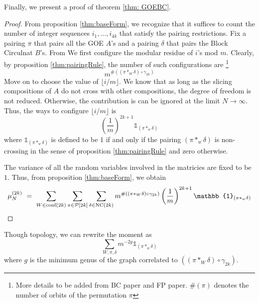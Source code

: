 \documentclass[12pt,reqno]{amsart}
\theoremstyle{plain} %
\theoremstyle{remark}
\theoremstyle{definition}
\begin{document}
Finally, we present a proof of theorem \ref{thm: GOEBC}.
\begin{proof} 
    From proposition \ref{thm:baseForm}, we recognize that 
    it suffices to count the number of integer sequences 
    $i_1, \dots, i_{4k}$ that satisfy the pairing restrictions. 
    Fix a pairing $\pi$ that pairs all the GOE $A$'s and a
    pairing $\delta$  that pairs the Block Circulnat $B$'s. 
    From 
    We first configure the modular residue of $i$'s mod $m$. 
    Clearly, by proposition \ref{thm:pairingRule}, the number of such configurations are \footnote{More details to be added 
    from BC paper and FP paper. $\#(\pi)$ denotes the number of orbits of the permutation $\pi$} 
    \[
    m^{
        \# ((\pi *_W \delta)\circ \gamma_{2k})
    }
    \]
    Move on to 
    choose the value of $\lfloor i / m \rfloor$. 
    We know that as long as the slicing compositions of $A$ do 
    not cross with other compositions, the degree of freedom 
    is not reduced. Otherwise, the contribution is can be ignored 
    at the limit $N \rightarrow \infty$. Thus, the ways to configure 
$\lfloor i / m \rfloor$ is 
\begin{equation}
        \left(
            \frac 1 m
        \right)^{2k + 1}
        \mathbb{1}_{(\pi*_w\delta)}
\end{equation}
where $\mathbb{1}_{(\pi*_w\delta)}$ is defined to be $1$ if and only if 
the pairing $(\pi*_w\delta)$ is non-crossing in the sense of proposition 
\ref{thm:pairingRule} and zero otherwise. 

The variance of all the random variables involved in the matricies are 
fixed to be $1$. Thus, from proposition \ref{thm:baseForm}, we obtain 
\label{thm: GOEBC}
    \begin{equation}
        \mu_N^{(2k)} \ = \ 
        \sum_{W \in \PW(2k)}
        \sum_{\pi \in \mathcal P[2k]}  
        \sum_{\delta \in \NC(2k)}   
        m^{
            \#((\pi *_W \delta) \circ \gamma_{2k} )
        }
        \left(
            \frac 1 m
        \right)^{2k + 1}
        \mathbb{1}_{(\pi*_w\delta)}
    \end{equation}
\end{proof}



\begin{remark}
    Though topology, we can rewrite the moment as
    \begin{equation}
        \sum_{W, \pi, \delta} m^{-2g} \mathbb{1}_{(\pi*_w\delta)}
    \end{equation}
    where $g$ is the minimum genus of the graph correlated to 
    $((\pi *_W \delta) \circ \gamma_{2k} )$. 
\end{remark}
\end{document}
